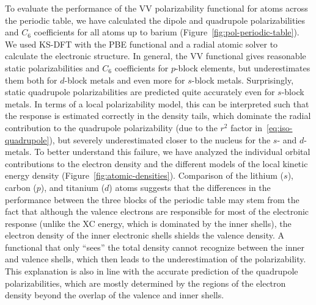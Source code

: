 To evaluate the performance of the VV polarizability functional for atoms across the periodic table, we have calculated the dipole and quadrupole polarizabilities and $C_6$ coefficients for all atoms up to barium (Figure~\ref{fig:pol-periodic-table}).
We used KS-DFT with the PBE functional and a radial atomic solver to calculate the electronic structure.
In general, the VV functional gives reasonable static polarizabilities and $C_6$ coefficients for $p$-block elements, but underestimates them both for $d$-block metals and even more for $s$-block metals.
Surprisingly, static quadrupole polarizabilities are predicted quite accurately even for $s$-block metals.
In terms of a local polarizability model, this can be interpreted such that the response is estimated correctly in the density tails, which dominate the radial contribution to the quadrupole polarizability (due to the $r^2$ factor in~\eqref{eq:iso-quadrupole}), but severely underestimated closer to the nucleus for the $s$- and $d$-metals.
To better understand this failure, we have analyzed the individual orbital contributions to the electron density and the different models of the local kinetic energy density (Figure~\ref{fig:atomic-densities}).
Comparison of the lithium ($s$), carbon ($p$), and titanium ($d$) atoms suggests that the differences in the performance between the three blocks of the periodic table may stem from the fact that although the valence electrons are responsible for most of the electronic response (unlike the XC energy, which is dominated by the inner shells), the electron density of the inner electronic shells shields the valence density.
A functional that only ``sees'' the total density cannot recognize between the inner and valence shells, which then leads to the underestimation of the polarizability.
This explanation is also in line with the accurate prediction of the quadrupole polarizabilities, which are mostly determined by the regions of the electron density beyond the overlap of the valence and inner shells.


